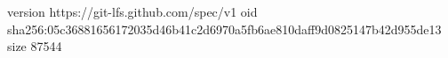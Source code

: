 version https://git-lfs.github.com/spec/v1
oid sha256:05c36881656172035d46b41c2d6970a5fb6ae810daff9d0825147b42d955de13
size 87544

